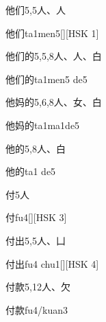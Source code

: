 \begin{Entry}{他们}{5,5}{⼈、⼈}
  \begin{Phonetics}{他们}{ta1men5}[][HSK 1]
  \end{Phonetics}
\end{Entry}

\begin{Entry}{他们的}{5,5,8}{⼈、⼈、⽩}
  \begin{Phonetics}{他们的}{ta1men5 de5}
  \end{Phonetics}
\end{Entry}

\begin{Entry}{他妈的}{5,6,8}{⼈、⼥、⽩}
  \begin{Phonetics}{他妈的}{ta1ma1de5}
  \end{Phonetics}
\end{Entry}

\begin{Entry}{他的}{5,8}{⼈、⽩}
  \begin{Phonetics}{他的}{ta1 de5}
  \end{Phonetics}
\end{Entry}

\begin{Entry}{付}{5}{⼈}
  \begin{Phonetics}{付}{fu4}[][HSK 3]
  \end{Phonetics}
\end{Entry}

\begin{Entry}{付出}{5,5}{⼈、⼐}
  \begin{Phonetics}{付出}{fu4 chu1}[][HSK 4]
  \end{Phonetics}
\end{Entry}

\begin{Entry}{付款}{5,12}{⼈、⽋}
  \begin{Phonetics}{付款}{fu4/kuan3}
  \end{Phonetics}
\end{Entry}

